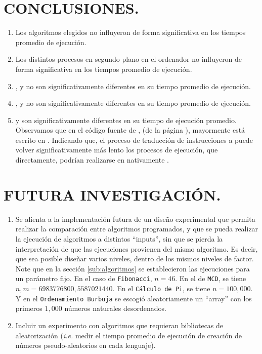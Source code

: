 \documentclass[11pt,a4paper]{article}
\begin{document}

\section{CONCLUSIONES.} %
\begin{enumerate}
	\item Los algoritmos elegidos no influyeron de forma significativa en los tiempos promedio de ejecución.
	\item Los distintos procesos en segundo plano en el ordenador no influyeron de forma significativa en los tiempos promedio de ejecución.
	\item {},  y  no son significativamente diferentes en su tiempo promedio de ejecución.
	\item {},  y  no son significativamente diferentes en su tiempo promedio de ejecución.
	\item {} y  son significativamente diferentes en su tiempo de ejecución promedio. \\[2mm]
	Observamos que en el código fuente de , (de la página ),  mayormente está escrito en . Indicando que, el proceso de traducción de instrucciones a  puede volver significativamente más lento los procesos de ejecución, que directamente, podrían realizarse en nativamente .
\end{enumerate}

\section{FUTURA INVESTIGACIÓN.} %
\begin{enumerate}
	\item Se alienta a la implementación futura de un diseño experimental que permita realizar la comparación entre algoritmos programados, y que se pueda realizar la ejecución de algoritmos a distintos ``inputs'', sin que se pierda la interpretación de que las ejecuciones provienen del mismo algoritmo. 
		Es decir, que sea posible diseñar varios niveles, dentro de los mismos niveles de factor.
		Note que en la sección \ref{sub:algoritmos} se establecieron las ejecuciones para un parámetro fijo.
		En el caso de \texttt{Fibonacci}, \(n=46\). En el de \texttt{MCD}, se tiene \(n,m = 6983776800,5587021440\). En el \texttt{Cálculo de Pi}, se tiene \(n = 100,000\). Y en el \texttt{Ordenamiento Burbuja} se escogió aleatoriamente un ``array'' con los primeros \(1,000\) números naturales desordenados.
	\item Incluir un experimento con algoritmos que requieran bibliotecas de aleatorización (\textit{i.e.} medir el tiempo promedio de ejecución de creación de números pseudo-aleatorios en cada lenguaje).
\end{enumerate}



\end{document}

